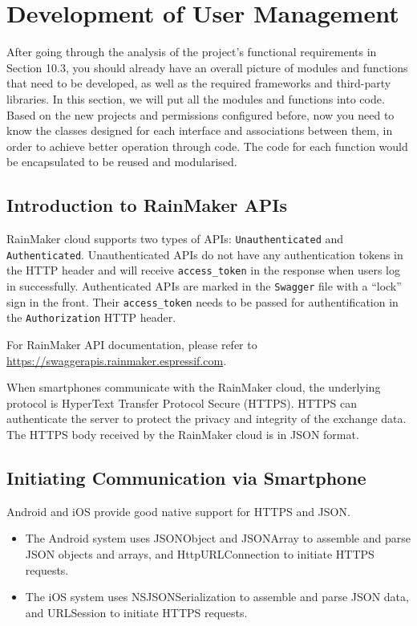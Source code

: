 \documentclass[a4paper,12pt]{book}
\begin{document}
\section{Development of User Management}
After going through the analysis of the project’s functional requirements in Section 10.3, you should already have an overall picture of modules and functions that need to be developed, as well as the required frameworks and third-party libraries. In this section, we will put all the modules and functions into code. Based on the new projects and permissions configured before, now you need to know the classes designed for each interface and associations between them, in order to achieve better operation through code. The code for each function would be encapsulated to be reused and modularised.

\subsection{Introduction to RainMaker APIs}
RainMaker cloud supports two types of APIs: \verb|Unauthenticated| and \verb|Authenticated|. Unauthenticated APIs do not have any authentication tokens in the HTTP header and will receive \verb|access_token| in the response when users log in successfully. Authenticated APIs are marked in the \verb|Swagger| file with a “lock” sign in the front. Their \verb|access_token| needs to be passed for authentification in the \verb|Authorization| HTTP header.

For RainMaker API documentation, please refer to \url{https://swaggerapis.rainmaker.espressif.com}.

When smartphones communicate with the RainMaker cloud, the underlying protocol is HyperText Transfer Protocol Secure (HTTPS). HTTPS can authenticate the server to protect the privacy and integrity of the exchange data. The HTTPS body received by the RainMaker cloud is in JSON format.

\subsection{Initiating Communication via Smartphone}
Android and iOS provide good native support for HTTPS and JSON.

\begin{itemize}
    \item The Android system uses JSONObject and JSONArray to assemble and parse JSON objects and arrays, and HttpURLConnection to initiate HTTPS requests.
    \item The iOS system uses NSJSONSerialization to assemble and parse JSON data, and URLSession to initiate HTTPS requests.
\end{itemize}
\end{document}
